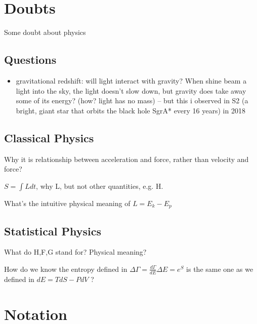 \newcommand{\DOF}{degree of freedom}

\section{Doubts}
Some doubt about physics

\subsection{Questions}
\begin{itemize}
    \item gravitational redshift: will light interact with gravity? When shine beam a light into the sky, the light doesn't slow down, but gravity does take away some of its energy? (how? light has no mass) -- but this i observed in S2 (a bright, giant star that orbits the black hole SgrA* every 16 years) in 2018
\end{itemize}
\subsection{Classical Physics}
\begin{description}[style=nextline]
    \item [Newton's Second Law]	Why it is relationship between acceleration
	and force, rather than velocity and force?
    \item [Action] $S = \int Ldt$, why L, but not other quantities, e.g. H.
    \item [Lagrangian] What's the intuitive physical meaning of 
	$L = E_{k} - E_{p}$
\end{description}

\subsection{Statistical Physics}
\begin{description}[style=nextline]
    \item [Enthalpy, Free energy, Gibbs Free energy] What do H,F,G stand for? 
	Physical meaning?
    \item [Entropy] How do we know the entropy defined in $\Delta \Gamma =
	\frac{d\Gamma}{dE}\Delta E = e^{S}$ is the same one as we defined in
	$dE = TdS - PdV$ ?
\end{description}


\section{Notation}
